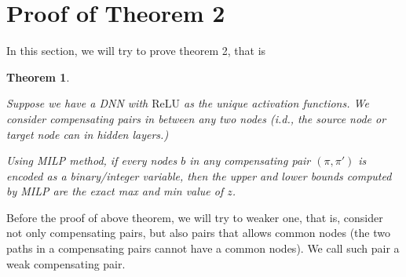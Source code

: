 \documentclass[]{article}
\newtheorem{theorem}{Theorem}
\theoremstyle{definition}
\newcommand{\ReLU}{\mathrm{ReLU}}
\begin{document}
%
%
%


\section{Proof of Theorem 2}

In this section, we will try to prove theorem 2, that is 

\begin{theorem}
	\label{no_diamond_3}
	
	Suppose we have a DNN with $\ReLU$ as the unique activation functions. We consider compensating pairs in between any two nodes (i.d., the source node or target node can in hidden layers.)
	
	Using MILP method, if every nodes $b$ in any compensating pair
	$(\pi,\pi')$ is encoded as a binary/integer variable, then the upper and lower 
	bounds computed by MILP are the exact max and min value of $z$.
\end{theorem}


Before the proof of above theorem, we will try to weaker one, that is, consider not only compensating pairs, but also pairs that allows common nodes (the two paths in a compensating pairs cannot have a common nodes). We call such pair a weak compensating pair.
\end{document}
